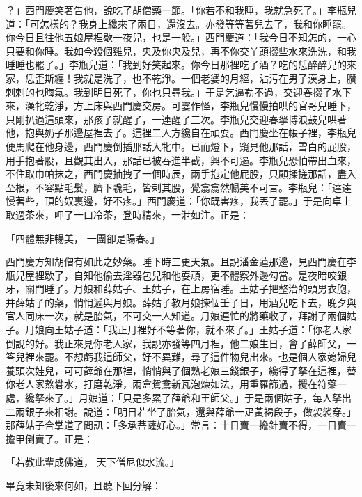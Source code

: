 \begin{showcontents}{}
？」西門慶笑著告他，說吃了胡僧藥一節。「你若不和我睡，我就急死了。」李瓶兒道：「可怎樣的？我身上纔來了兩日，還沒去。亦發等等著兒去了，我和你睡罷。你今日且往他五娘屋裡歇一夜兒，也是一般。」西門慶道：「我今日不知怎的，一心只要和你睡。我如今殺個雞兒，央及你央及兒，再不你交丫頭掇些水來洗洗，和我睡睡也罷了。」李瓶兒道：「我到好笑起來。你今日那裡吃了酒？吃的恁醉醉兒的來家，恁歪斯纏！我就是洗了，也不乾淨。一個老婆的月經，沾污在男子漢身上，臢剌剌的也晦氣。我到明日死了，你也只尋我。」于是乞逼勒不過，交迎春掇了水下來，澡牝乾淨，方上床與西門慶交房。可霎作怪，李瓶兒慢慢拍哄的官哥兒睡下，只剛扒過這頭來，那孩子就醒了，一連醒了三次。李瓶兒交迎春拏博浪鼓兒哄著他，抱與奶子那邊屋裡去了。這裡二人方纔自在頑耍。西門慶坐在帳子裡，李瓶兒便馬爬在他身邊，西門慶倒插那話入牝中。已而燈下，窺見他那話，雪白的屁股，用手抱著股，且觀其出入，那話已被吞進半截，興不可遏。李瓶兒恐怕帶出血來，不住取巾帕抹之，西門慶抽拽了一個時辰，兩手抱定他屁股，只顧揉搓那話，盡入至根，不容點毛髮，臍下毳毛，皆剌其股，覺翕翕然暢美不可言。李瓶兒：「達達慢著些，頂的奴裏邊，好不疼。」西門慶道：「你既害疼，我丟了罷。」于是向卓上取過茶來，呷了一口冷茶，登時精來，一泄如注。正是：

「四體無非暢美，  一團卻是陽春。」

西門慶方知胡僧有如此之妙藥。睡下時三更天氣。且說潘金蓮那邊，見西門慶在李瓶兒屋裡歇了，自知他偷去淫器包兒和他耍頑，更不體察外邊勾當。是夜暗咬銀牙，關門睡了。月娘和薛姑子、王姑子，在上房宿睡。王姑子把整治的頭男衣胞，并薛姑子的藥，悄悄遞與月娘。薛姑子教月娘揀個壬子日，用酒兒吃下去，晚夕與官人同床一次，就是胎氣，不可交一人知道。月娘連忙的將藥收了，拜謝了兩個姑子。月娘向王姑子道：「我正月裡好不等著你，就不來了。」王姑子道：「你老人家倒說的好。我正來見你老人家，我說亦發等四月裡，他二娘生日，會了薛師父，一答兒裡來罷。不想虧我這師父，好不異難，尋了這件物兒出來。也是個人家媳婦兒養頭次娃兒，可可薛爺在那裡，悄悄與了個熟老娘三錢銀子，纔得了拏在這裡，替你老人家熬礬水，打磨乾淨，兩盒鴛鴦新瓦泡煉如法，用重羅篩過，攪在符藥一處，纔拏來了。」月娘道：「只是多累了薛爺和王師父。」于是兩個姑子，每人拏出二兩銀子來相謝。說道：「明日若坐了胎氣，還與薛爺一疋黃褐段子，做袈裟穿。」那薛姑子合掌道了問訊：「多承菩薩好心。」常言：十日賣一擔針賣不得，一日賣一擔甲倒賣了。正是：

「若教此輩成佛道，  天下僧尼似水流。」

畢竟未知後來何如，且聽下回分解：




\end{showcontents}


